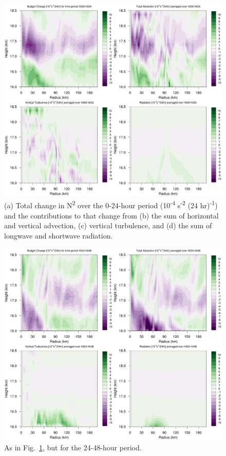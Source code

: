\documentclass{ametsoc}
\begin{document}
\begin{figure}[ht]
\centerline{\includegraphics[width=39pc]{figures/fig05_h000-h024-budgetterms.png}}
\caption{(a) Total change in N\textsuperscript{2} over the 0-24-hour period (10\textsuperscript{-4} s\textsuperscript{-2} (24 hr)\textsuperscript{-1}) and the contributions to that change from (b) the sum of horizontal and vertical advection, (c) vertical turbulence, and (d) the sum of longwave and shortwave radiation.}
\label{fig:stab-00-24}
\end{figure}

\begin{figure}[ht]
\centerline{\includegraphics[width=39pc]{figures/fig06_h024-h048-budgetterms.png}}
\caption{As in Fig.~\ref{fig:stab-00-24}, but for the 24-48-hour period.}
\label{fig:stab-24-48}
\end{figure}
\end{document}
